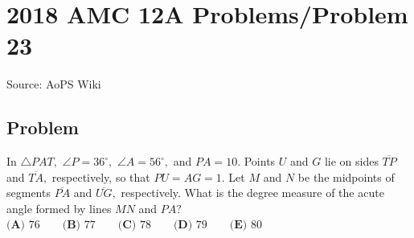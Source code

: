 \documentclass[12pt]{article}
\begin{document}
\section*{{2018 AMC 12A Problems/Problem 23}}
Source: AoPS Wiki

\subsection*{Problem}
In $\triangle PAT,$ $\angle P=36^{\circ},$ $\angle A=56^{\circ},$ and $PA=10.$ Points $U$ and $G$ lie on sides $\overline{TP}$ and $\overline{TA},$ respectively, so that $PU=AG=1.$ Let $M$ and $N$ be the midpoints of segments $\overline{PA}$ and $\overline{UG},$ respectively. What is the degree measure of the acute angle formed by lines $MN$ and $PA?$ $\textbf{(A) } 76 \qquad \textbf{(B) } 77 \qquad \textbf{(C) } 78 \qquad \textbf{(D) } 79 \qquad \textbf{(E) } 80$
\end{document}
